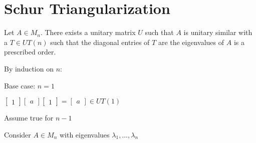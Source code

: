 \documentclass[letterpaper,12pt,fleqn]{article}
\renewcommand{\l}{\lambda}
\begin{document}
\section*{Schur Triangularization}

\begin{theorem}
  Let $A\in M_n$. There exists a unitary matrix $U$ such that $A$ is unitary
  similar with a $T\in UT(n)$ such that the diagonal entries of $T$ are the
  eigenvalues of $A$ is a prescribed order.
\end{theorem}

\begin{theproof}
  By induction on $n$:
  \begin{description}
  \item Base case: $n=1$
    
    $\begin{bmatrix} 1 \end{bmatrix}\begin{bmatrix} a \end{bmatrix}
    \begin{bmatrix} 1 \end{bmatrix}=\begin{bmatrix} a \end{bmatrix} \in UT(1)$

  \item Assume true for $n-1$

  \item Consider $A\in M_n$ with eigenvalues $\l_1,\ldots,\l_n$


\end{description}
\end{theproof}
\end{document}
